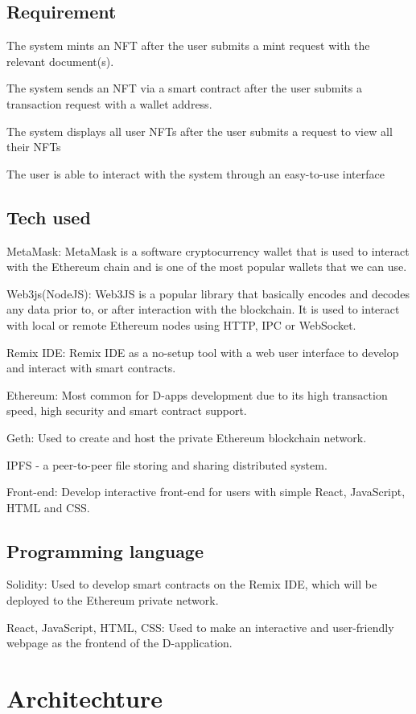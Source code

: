 \documentclass[conference]{IEEEtran}
\begin{document}
\subsection{Requirement}
The system mints an NFT after the user submits a mint request with the relevant document(s).

The system sends an NFT via a smart contract after the user submits a transaction request with a wallet address.

The system displays all user NFTs after the user submits a request to view all their NFTs

The user is able to interact with the system through an easy-to-use interface

\subsection{Tech used}
MetaMask: MetaMask is a software cryptocurrency wallet that is used to interact with the Ethereum chain and is one of the most popular wallets that we can use.

Web3js(NodeJS): Web3JS is a popular library that basically encodes and decodes any data prior to, or after interaction with the blockchain. It is used to interact with local or remote Ethereum nodes using HTTP, IPC or WebSocket. 

Remix IDE: Remix IDE as a no-setup tool with a web user interface to develop and interact with smart contracts.

Ethereum: Most common for D-apps development due to its high transaction speed, high security and smart contract support. 

Geth: Used to create and host the private Ethereum blockchain network.

IPFS - a peer-to-peer file storing and sharing distributed system.

Front-end: Develop interactive front-end for users with simple React, JavaScript, HTML and CSS.

\subsection{Programming language}
Solidity: Used to develop smart contracts on the Remix IDE, which will be deployed to the Ethereum private network.

React, JavaScript, HTML, CSS: Used to make an interactive and user-friendly webpage as the frontend of the D-application.


\section{Architechture}
\end{document}
